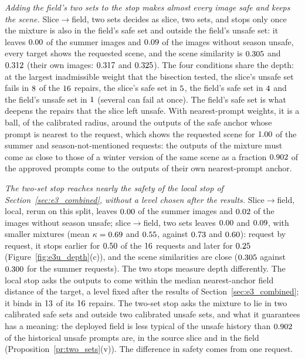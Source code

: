 \documentclass{article}
\theoremstyle{plain}
\theoremstyle{remark}
\begin{document}
\emph{Adding the field's two sets to the stop makes almost every image safe and keeps the scene.} Slice$\to$field, two sets decides as
slice, two sets, and stops only once the mixture is also in the field's safe set and outside the field's unsafe set: it leaves
$0.00$ of the summer images and $0.09$ of the images without season unsafe, every target shows the requested
scene, and the scene similarity is $0.305$ and $0.312$ (their own images: $0.317$ and $0.325$).
The four conditions share the depth: at the largest inadmissible weight that the bisection tested, the slice's unsafe set fails in
$8$ of the $16$ repairs, the slice's safe set in $5$, the field's safe set in
$4$ and the field's unsafe set in $1$ (several can fail at once). The field's safe set is
what deepens the repairs that the slice left unsafe. With nearest-prompt weights, it is a ball, of the calibrated radius, around the outputs
of the safe anchor whose prompt is nearest to the request, which shows the requested scene for $1.00$ of the summer and
season-not-mentioned requests: the outputs of the mixture must come as close to those of a winter version of the same scene as a fraction
$0.902$ of the approved prompts come to the outputs of their own nearest-prompt anchor.

\emph{The two-set stop reaches nearly the safety of the local stop of Section~\ref{sec:e3_combined}, without a level chosen after the
results.} Slice$\to$field, local, rerun on this split, leaves $0.00$ of the summer images and $0.02$ of the images
without season unsafe; slice$\to$field, two sets leaves $0.00$ and $0.09$, with smaller mixtures (mean
$\kappa=0.69$ and $0.55$, against $0.73$ and $0.60$): request by request, it stops earlier for
$0.50$ of the $16$ requests and later for $0.25$ (Figure~\ref{fig:e3u_depth}(c)), and
the scene similarities are close ($0.305$ against $0.300$ for the summer requests). The two stops measure depth
differently. The local stop asks the outputs to come within the median nearest-anchor field distance of the target, a level fixed after
the results of Section~\ref{sec:e3_combined}; it binds in $13$ of its $16$ repairs. The two-set stop asks the
mixture to lie in two calibrated safe sets and outside two calibrated unsafe sets, and what it guarantees has a meaning: the deployed field
is less typical of the unsafe history than $0.902$ of the historical unsafe prompts are, in the source slice and in the field
(Proposition~\ref{pr:two_sets}(v)). The difference in safety comes from one request.
\end{document}
